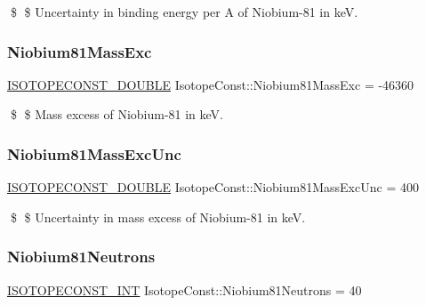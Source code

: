 \$ \$ Uncertainty in binding energy per A of Niobium-\/81 in keV. \mbox{\label{group___isotope_const-_niobium-_nb81_ga239c138f4d37d2d7337d2ebc0c4311d4}} 
\subsubsection{\texorpdfstring{Niobium81\+Mass\+Exc}{Niobium81MassExc}}
{\footnotesize\ttfamily \mbox{\hyperlink{group___isotope_const-_macros_ga8f45a7272ce02c0b4c65c44636ed719a}{I\+S\+O\+T\+O\+P\+E\+C\+O\+N\+S\+T\+\_\+\+D\+O\+U\+B\+LE}} Isotope\+Const\+::\+Niobium81\+Mass\+Exc = -\/46360}

\$ \$ Mass excess of Niobium-\/81 in keV. \mbox{\label{group___isotope_const-_niobium-_nb81_ga39fbb168a9841a297f65f5086e355530}} 
\subsubsection{\texorpdfstring{Niobium81\+Mass\+Exc\+Unc}{Niobium81MassExcUnc}}
{\footnotesize\ttfamily \mbox{\hyperlink{group___isotope_const-_macros_ga8f45a7272ce02c0b4c65c44636ed719a}{I\+S\+O\+T\+O\+P\+E\+C\+O\+N\+S\+T\+\_\+\+D\+O\+U\+B\+LE}} Isotope\+Const\+::\+Niobium81\+Mass\+Exc\+Unc = 400}

\$ \$ Uncertainty in mass excess of Niobium-\/81 in keV. \mbox{\label{group___isotope_const-_niobium-_nb81_ga4ca5f9043acd86f0b5c2d61c0b94ed5f}} 
\subsubsection{\texorpdfstring{Niobium81\+Neutrons}{Niobium81Neutrons}}
{\footnotesize\ttfamily \mbox{\hyperlink{group___isotope_const-_macros_ga5f18360b3e99483a35c32d789e62621c}{I\+S\+O\+T\+O\+P\+E\+C\+O\+N\+S\+T\+\_\+\+I\+NT}} Isotope\+Const\+::\+Niobium81\+Neutrons = 40}

